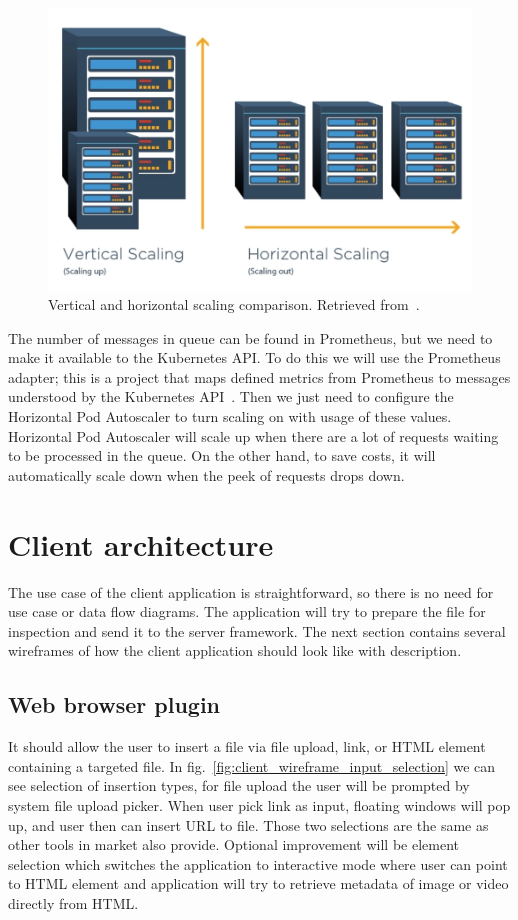 \begin{figure}[H]
    \centering
    \includegraphics[width=.675\linewidth]{other-fig/scaling.png}
    \caption{Vertical and horizontal scaling comparison. Retrieved from~\cite{Scaling}.}
    \label{fig:scaling}
\end{figure}

The number of messages in queue can be found in Prometheus, but we need to make it available to the Kubernetes API. To do this we will use the Prometheus adapter; this is a project that maps defined metrics from Prometheus to messages understood by the Kubernetes API~\cite{PrometheusAdapter}. Then we just need to configure the Horizontal Pod Autoscaler to turn scaling on with usage of these values. Horizontal Pod Autoscaler will scale up when there are a lot of requests waiting to be processed in the queue. On the other hand, to save costs, it will automatically scale down when the peek of requests drops down.

\chapter{Client architecture}

The use case of the client application is straightforward, so there is no need for use case or data flow diagrams. The application will try to prepare the file for inspection and send it to the server framework. The next section contains several wireframes of how the client application should look like with description.

\section{Web browser plugin}

It should allow the user to insert a file via file upload, link, or HTML element containing a targeted file. In fig.~\ref{fig:client_wireframe_input_selection} we can see selection of insertion types, for file upload the user will be prompted by system file upload picker. When user pick link as input, floating windows will pop up, and user then can insert URL to file. Those two selections are the same as other tools in market also provide. Optional improvement will be element selection which switches the application to interactive mode where user can point to HTML element and application will try to retrieve metadata of image or video directly from HTML. 

